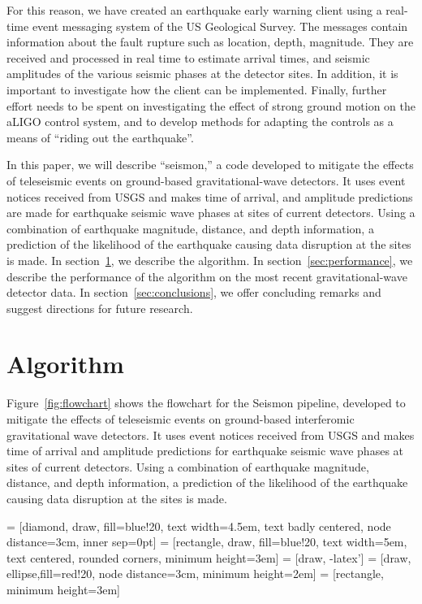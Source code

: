 \documentclass[reprint, prl, aps, showpacs]{revtex4-1}
\begin{document}
For this reason, we have created an earthquake early warning client using a real-time event messaging system of the US Geological Survey. The messages contain information about the fault rupture such as location, depth, magnitude. They are received and processed in real time to estimate arrival times, and seismic amplitudes of the various seismic phases at the detector sites. In addition, it is important to investigate how the client can be implemented. Finally, further effort needs to be spent on investigating the effect of strong ground motion on the aLIGO control system, and to develop methods for adapting the controls as a means of ``riding out the earthquake''.

In this paper, we will describe ``seismon,'' a code developed to mitigate the effects of teleseismic events on ground-based gravitational-wave detectors. It uses event notices received from USGS and makes time of arrival, and amplitude predictions are made for earthquake seismic wave phases at sites of current detectors. Using a combination of earthquake magnitude, distance, and depth information, a prediction of the likelihood of the earthquake causing data disruption at the sites is made.
In section~\ref{sec:algorithm}, we describe the algorithm.
In section~\ref{sec:performance}, we describe the performance of the algorithm on the most recent gravitational-wave detector data.
In section~\ref{sec:conclusions}, we offer concluding remarks and suggest directions for future research.

\section{Algorithm}
\label{sec:algorithm}

Figure~\ref{fig:flowchart} shows the flowchart for the Seismon pipeline, developed to mitigate the effects of teleseismic events on ground-based interferomic gravitational wave detectors. It uses event notices received from USGS and makes time of arrival and amplitude predictions for earthquake seismic wave phases at sites of current detectors. Using a combination of earthquake magnitude, distance, and depth information, a prediction of the likelihood of the earthquake causing data disruption at the sites is made.

 = [diamond, draw, fill=blue!20,
    text width=4.5em, text badly centered, node distance=3cm, inner sep=0pt]
 = [rectangle, draw, fill=blue!20,
    text width=5em, text centered, rounded corners, minimum height=3em]
 = [draw, -latex']
 = [draw, ellipse,fill=red!20, node distance=3cm,
    minimum height=2em]
 = [rectangle, minimum height=3em]
\end{document}
